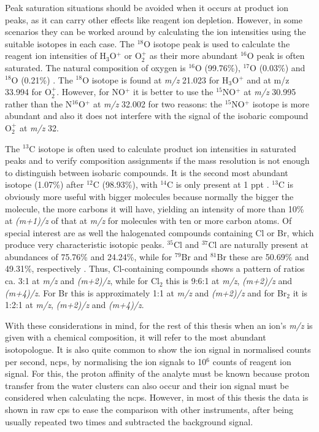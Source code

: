 
Peak saturation situations should be avoided when it occurs at product ion peaks, as it can carry other effects like reagent ion depletion.
However, in some scenarios they can be worked around by calculating the ion intensities using the suitable isotopes in each case.
The $^{18}$O isotope peak is used to calculate the reagent ion intensities of  H$_3$O$^+$ or O$_2^+$ as their more abundant $^{16}$O peak is often saturated.
The natural composition of oxygen is $^{16}$O (99.76\%), $^{17}$O (0.03\%) and $^{18}$O (0.21\%) \cite{nistoxygen}.
The $^{18}$O isotope is found at \textit{m/z} 21.023 for H$_3$O$^+$ and at m/z 33.994 for O$_2^+$.
However, for NO$^+$ it is better to use the $^{15}$NO$^+$ at \textit{m/z} 30.995 rather than the N$^{16}$O$^+$ at \textit{m/z}  32.002 for two reasons: the $^{15}$NO$^+$  isotope  is more abundant  and also it does not interfere with the  signal of the isobaric compound O$_2^+$  at \textit{m/z}  32.

The $^{13}$C isotope is often used to calculate product ion intensities in saturated peaks and to verify composition assignments if the mass resolution is not enough to distinguish between isobaric compounds.
It is the second most abundant isotope (1.07\%) after  $^{12}$C (98.93\%), with  $^{14}$C is only present at 1 ppt \cite{nistcarbon}.
$^{13}$C is obviously more useful with bigger molecules because normally the bigger the molecule, the more carbons it will have, yielding an intensity of more than 10\% at \textit{(m+1)/z} of that at \textit{m/z} for molecules with ten or more carbon atoms.
Of special interest are as well the halogenated compounds containing Cl or Br, which produce  very characteristic isotopic  peaks. $^{35}$Cl and $^{37}$Cl are naturally present at abundances of 75.76\% and 24.24\%, while for $^{79}$Br and $^{81}$Br these are 50.69\% and 49.31\%, respectively \cite{nistcl,nistbr}.
Thus, Cl-containing compounds shows a pattern of ratios ca. 3:1 at  \textit{m/z} and \textit{(m+2)/z}, while for Cl$_2$ this is 9:6:1 at  \textit{m/z}, \textit{(m+2)/z} and \textit{(m+4)/z}. For Br this is approximately 1:1 at  \textit{m/z} and \textit{(m+2)/z} and for Br$_2$ it is 1:2:1 at \textit{m/z}, \textit{(m+2)/z} and \textit{(m+4)/z}.

With these considerations in mind, for the rest of this thesis when an ion's \textit{m/z} is given with a chemical composition, it will refer to the most abundant isotopologue.
It is also quite common to show the ion signal in normalised counts per second, \acrshort{ncps}, by normalising the ion signals to 10$^6$ counts of reagent ion signal. For this, the proton affinity of the analyte must be known because proton transfer from the water clusters can also occur and their ion signal must be considered when calculating the ncps. However, in most of this thesis  the data is shown in raw cps to ease the comparison with other instruments, after being usually repeated two times and subtracted the background signal.










